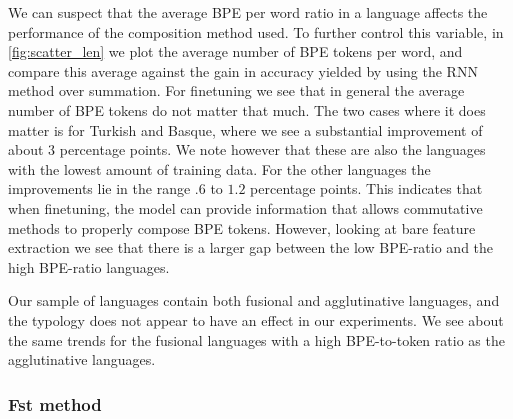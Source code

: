 \documentclass[11pt]{article}
\newcommand\adam[1]{(\textbf{Adam:} #1)}
\begin{document}
             We can suspect that the average BPE per word ratio in a
     language affects the performance of the composition method
     used. To further control this variable, in \cref{fig:scatter_len}
     we plot the average number of BPE tokens per word, and compare
     this average against the gain in accuracy yielded by using the
     RNN method over summation.  For finetuning we see that in
     general the average number of BPE tokens do not matter that
     much. The two cases where it does matter is for Turkish and
     Basque, where we see a substantial improvement of about $3$
     percentage points. We note however that these are also the
     languages with the lowest amount of training data.
        For the other languages the improvements lie in the range $.6$
     to $1.2$ percentage points. This indicates that when finetuning,
     the model can provide information that allows commutative methods
     to properly compose BPE tokens. However, looking at bare feature
     extraction we see that there is a larger gap between the low
     BPE-ratio and the high BPE-ratio languages.

        Our sample of languages contain both fusional and
     agglutinative languages, and the typology does not appear to have
     an effect in our experiments. We see about the same trends for
     the fusional languages with a high BPE-to-token ratio as the
     agglutinative languages.

    

    \subsubsection{Fst method}
\end{document}
